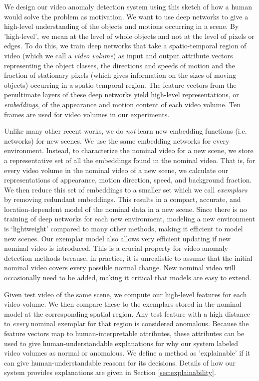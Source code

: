 We design our video anomaly detection system using this sketch of how a human would solve the problem as motivation.  We want to use deep networks to give a high-level understanding of the objects and motions occurring in a scene. By 'high-level', we mean at the level of whole objects and not at the level of pixels or edges.
To do this, we train deep networks that take a spatio-temporal region of video (which we call a {\em video volume}) as input and output attribute vectors representing the object classes, the directions and speeds of motion and the fraction of stationary pixels (which gives information on the sizes of moving objects) occurring in a spatio-temporal region.   The feature vectors from the penultimate layers of these deep networks yield high-level representations, or {\em embeddings}, of the appearance and motion content of each video volume. Ten frames are used for video volumes in our experiments.

Unlike many other recent works, we do {\em not} learn new embedding functions (i.e. networks) for new scenes. We use the same embedding networks for every environment. Instead, to characterize the nominal video for a new scene, we store a representative set of all the embeddings found in the nominal video. That is, for every video volume in the nominal video of a new scene, we calculate our representations of appearance, motion direction, speed, and background fraction. We then reduce this set of embeddings to a smaller set which we call {\it exemplars} by removing redundant embeddings. This results in a compact, accurate, and location-dependent model of the nominal data in a new scene.
Since there is no training of deep networks for each new environment, modeling a new environment is `lightweight' compared to many other methods, making it efficient to model new scenes.  Our exemplar model also allows very efficient updating if new nominal video is introduced.  This is a crucial property for video anomaly detection methods because, in practice, it is unrealistic to assume that the initial nominal video covers every possible normal change.  New nominal video will occasionally need to be added, making it critical that models are easy to extend.

Given test video of the same scene, we compute our high-level features for each video volume.  We then compare these to the exemplars stored in the nominal model at the corresponding spatial region.  Any test feature with a high distance to \textit{every} nominal exemplar for that region is considered anomalous.
Because the feature vectors map to human-interpretable attributes, these attributes can be used to give human-understandable explanations for why our system labeled video volumes as normal or anomalous.
We define a method as 'explainable' if it can give human-understandable reasons for its decisions.  Details of how our system provides explanations are given in Section \ref{sec:explainability}.

